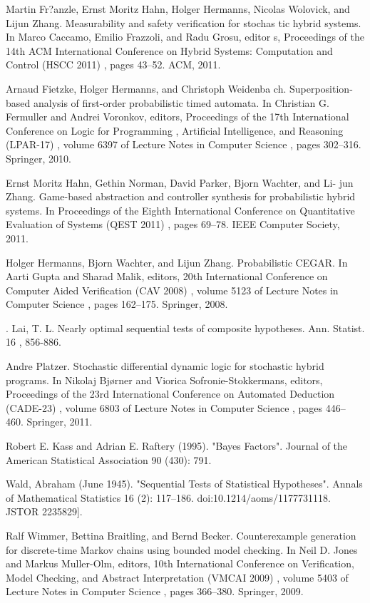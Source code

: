 \documentclass[runningheads,a4paper]{llncs}
\begin{document}
\noindent[FHH + 11] Martin Fr?anzle, Ernst Moritz Hahn, Holger Hermanns, Nicolas Wolovick, and Lijun Zhang. Measurability and safety verification for stochas tic hybrid systems. In Marco Caccamo, Emilio Frazzoli, and Radu Grosu, editor s, Proceedings of the 14th ACM International Conference on Hybrid Systems: Computation and Control (HSCC 2011) , pages 43–52. ACM, 2011.

\noindent[FHW10] Arnaud Fietzke, Holger Hermanns, and Christoph Weidenba ch. Superposition-based analysis of first-order probabilistic timed automata. In Christian G. Fermuller and Andrei Voronkov, editors, Proceedings of the 17th International Conference on Logic for Programming , Artificial Intelligence, and Reasoning (LPAR-17) , volume 6397 of Lecture Notes in Computer Science , pages 302–316. Springer, 2010.

\noindent[[HNP + 11] Ernst Moritz Hahn, Gethin Norman, David Parker, Bjorn Wachter, and Li- jun Zhang. Game-based abstraction and controller synthesis for probabilistic hybrid systems. In Proceedings of the Eighth International Conference on Quantitative Evaluation of Systems (QEST 2011) , pages 69–78. IEEE Computer Society, 2011.

\noindent[HWZ08] Holger Hermanns, Bjorn Wachter, and Lijun Zhang. Probabilistic CEGAR. In Aarti Gupta and Sharad Malik, editors, 20th International Conference on Computer Aided Verification (CAV 2008) , volume 5123 of Lecture Notes in Computer Science , pages 162–175. Springer, 2008.

\noindent[Lai88]. Lai, T. L. Nearly optimal sequential tests of composite hypotheses. Ann. Statist. 16 , 856-886.

\noindent[Pla11] Andre Platzer. Stochastic differential dynamic logic for stochastic hybrid programs. In Nikolaj Bjørner and Viorica Sofronie-Stokkermans, editors, Proceedings of the 23rd International Conference on Automated Deduction (CADE-23) , volume 6803 of Lecture Notes in Computer Science , pages 446– 460. Springer, 2011.

\noindent[RA95] Robert E. Kass and Adrian E. Raftery (1995). "Bayes Factors". Journal of the American Statistical Association 90 (430): 791.

\noindent[WA45] Wald, Abraham (June 1945). "Sequential Tests of Statistical Hypotheses". Annals of Mathematical Statistics 16 (2): 117–186. doi:10.1214/aoms/1177731118. JSTOR 2235829].

\noindent[WBB09] Ralf Wimmer, Bettina Braitling, and Bernd Becker. Counterexample generation for discrete-time Markov chains using bounded model checking. In Neil D. Jones and Markus Muller-Olm, editors, 10th International Conference on Verification, Model Checking, and Abstract Interpretation (VMCAI 2009) , volume 5403 of Lecture Notes in Computer Science , pages 366–380. Springer, 2009.
\end{document}
